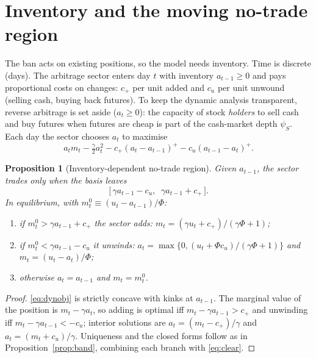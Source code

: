 \documentclass[11pt,a4paper]{article}
\theoremstyle{plain}
\newtheorem{proposition}{Proposition}
\theoremstyle{definition}
\theoremstyle{remark}
\begin{document}
\section{Inventory and the moving no-trade region}\label{sec:inv}
The ban acts on existing positions, so the model needs inventory. Time is discrete (days). The arbitrage sector enters
day $t$ with inventory $a_{t-1}\ge 0$ and pays proportional costs on changes: $c_+$ per unit added and $c_u$ per unit
unwound (selling cash, buying back futures). To keep the dynamic analysis transparent, reverse arbitrage is set aside
($a_t\ge 0$): the capacity of stock \emph{holders} to sell cash and buy futures when futures are cheap is part of the
cash-market depth $\psi_S$. Each day the sector chooses $a_t$ to maximise
\begin{equation}\label{eq:dynobj}
a_t m_t-\tfrac{\gamma}{2}a_t^2 - c_+(a_t-a_{t-1})^+ - c_u(a_{t-1}-a_t)^+ .
\end{equation}

\begin{proposition}[Inventory-dependent no-trade region]\label{prop:inv}
Given $a_{t-1}$, the sector trades only when the basis leaves
\begin{equation}
\big[\,\gamma a_{t-1}-c_u,\;\; \gamma a_{t-1}+c_+\,\big].
\end{equation}
In equilibrium, with $m^0_t\equiv(u_t-a_{t-1})/\Phi$:
\begin{enumerate}[label=(\alph*),leftmargin=1.8em,itemsep=1pt]
\item if $m^0_t>\gamma a_{t-1}+c_+$ the sector adds: $m_t=(\gamma u_t+c_+)/(\gamma\Phi+1)$;
\item if $m^0_t<\gamma a_{t-1}-c_u$ it unwinds: $a_t=\max\{0,(u_t+\Phi c_u)/(\gamma\Phi+1)\}$ and $m_t=(u_t-a_t)/\Phi$;
\item otherwise $a_t=a_{t-1}$ and $m_t=m^0_t$.
\end{enumerate}
\end{proposition}
\begin{proof}
\eqref{eq:dynobj} is strictly concave with kinks at $a_{t-1}$. The marginal value of the position is $m_t-\gamma a_t$, so
adding is optimal iff $m_t-\gamma a_{t-1}>c_+$ and unwinding iff $m_t-\gamma a_{t-1}<-c_u$; interior solutions are
$a_t=(m_t-c_+)/\gamma$ and $a_t=(m_t+c_u)/\gamma$. Uniqueness and the closed forms follow as in
Proposition~\ref{prop:band}, combining each branch with \eqref{eq:clear}.
\end{proof}
\end{document}
